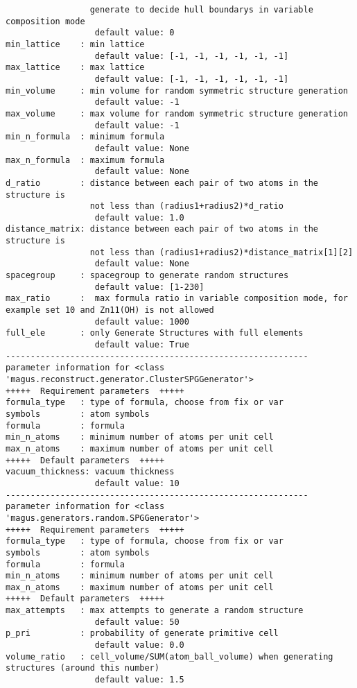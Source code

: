 \documentclass[12pt,oneside]{book}
\begin{document}
\begin{tcolorbox}
\begin{verbatim}
                 generate to decide hull boundarys in variable composition mode
                  default value: 0
min_lattice    : min lattice
                  default value: [-1, -1, -1, -1, -1, -1]
max_lattice    : max lattice
                  default value: [-1, -1, -1, -1, -1, -1]
min_volume     : min volume for random symmetric structure generation
                  default value: -1
max_volume     : max volume for random symmetric structure generation
                  default value: -1
min_n_formula  : minimum formula
                  default value: None
max_n_formula  : maximum formula
                  default value: None
d_ratio        : distance between each pair of two atoms in the structure is
                 not less than (radius1+radius2)*d_ratio
                  default value: 1.0
distance_matrix: distance between each pair of two atoms in the structure is
                 not less than (radius1+radius2)*distance_matrix[1][2]
                  default value: None
spacegroup     : spacegroup to generate random structures
                  default value: [1-230]
max_ratio      :  max formula ratio in variable composition mode, for example set 10 and Zn11(OH) is not allowed
                  default value: 1000
full_ele       : only Generate Structures with full elements
                  default value: True
-------------------------------------------------------------
parameter information for <class 'magus.reconstruct.generator.ClusterSPGGenerator'>
+++++  Requirement parameters  +++++
formula_type   : type of formula, choose from fix or var
symbols        : atom symbols
formula        : formula
min_n_atoms    : minimum number of atoms per unit cell
max_n_atoms    : maximum number of atoms per unit cell
+++++  Default parameters  +++++
vacuum_thickness: vacuum thickness
                  default value: 10
-------------------------------------------------------------
parameter information for <class 'magus.generators.random.SPGGenerator'>
+++++  Requirement parameters  +++++
formula_type   : type of formula, choose from fix or var
symbols        : atom symbols
formula        : formula
min_n_atoms    : minimum number of atoms per unit cell
max_n_atoms    : maximum number of atoms per unit cell
+++++  Default parameters  +++++
max_attempts   : max attempts to generate a random structure
                  default value: 50
p_pri          : probability of generate primitive cell
                  default value: 0.0
volume_ratio   : cell_volume/SUM(atom_ball_volume) when generating structures (around this number)
                  default value: 1.5

\end{verbatim}
\end{tcolorbox}
\end{document}
